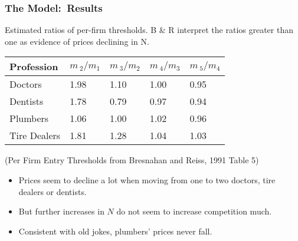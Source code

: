 \documentclass[notes=show]{beamer}
\begin{document}
\begin{frame}%

\frametitle{The Model:\ Results}

Estimated ratios of per-firm thresholds. B \& R interpret the ratios greater
than one as evidence of prices declining in N.

\begin{center}
\begin{tabular}{|l|l|l|l|l|}
\hline
Profession & $m\,_{2}/m_{1}$ & $m\,_{3}/m_{2}$ & $m\,_{4}/m_{3}$ & $%
m\,_{5}/m_{4}$ \\ \hline
Doctors & 1.98 & 1.10 & 1.00 & 0.95 \\ \hline
Dentists & 1.78 & 0.79 & 0.97 & 0.94 \\ \hline
Plumbers & 1.06 & 1.00 & 1.02 & 0.96 \\ \hline
Tire Dealers & 1.81 & 1.28 & 1.04 & 1.03 \\ \hline
\end{tabular}
\end{center}

(Per Firm Entry Thresholds from Bresnahan and Reiss, 1991 Table 5\bigskip )

\begin{itemize}
\item Prices seem to decline a lot when moving from one to two doctors, tire
dealers or dentists.

\item But further increases in $N$ do not seem to increase competition much.

\item Consistent with old jokes, plumbers' prices never fall.
\end{itemize}

\end{frame}%
\end{document}

